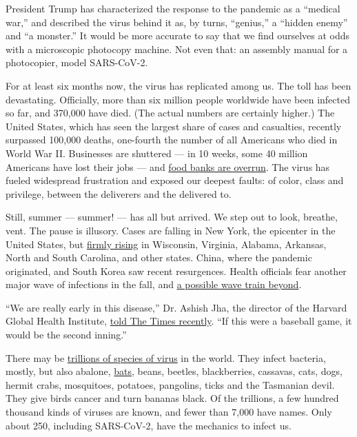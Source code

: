 President Trump has characterized the response to the pandemic as a
``medical war,'' and described the virus behind it as, by turns,
``genius,'' a ``hidden enemy'' and ``a monster.'' It would be more
accurate to say that we find ourselves at odds with a microscopic
photocopy machine. Not even that: an assembly manual for a photocopier,
model SARS-CoV-2.

For at least six months now, the virus has replicated among us. The toll
has been devastating. Officially, more than six million people worldwide
have been infected so far, and 370,000 have died. (The actual numbers
are certainly higher.) The United States, which has seen the largest
share of cases and casualties, recently surpassed 100,000 deaths,
one-fourth the number of all Americans who died in World War II.
Businesses are shuttered --- in 10 weeks, some 40 million Americans have
lost their jobs --- and
\href{https://www.nytimes.com/2020/04/08/business/economy/coronavirus-food-banks.html}{food
banks are overrun}. The virus has fueled widespread frustration and
exposed our deepest faults: of color, class and privilege, between the
deliverers and the delivered to.

Still, summer --- summer! --- has all but arrived. We step out to look,
breathe, vent. The pause is illusory. Cases are falling in New York, the
epicenter in the United States, but
\href{https://www.nytimes.com/interactive/2020/us/coronavirus-us-cases.html?action=click\&pgtype=Article\&state=default\&module=styln-coronavirus-markets\&variant=show\&region=TOP_BANNER\&context=storylines_menu\#states}{firmly
rising} in Wisconsin, Virginia, Alabama, Arkansas, North and South
Carolina, and other states. China, where the pandemic originated, and
South Korea saw recent resurgences. Health officials fear another major
wave of infections in the fall, and
\href{https://www.nytimes.com/2020/05/08/health/coronavirus-pandemic-curve-scenarios.html}{a
possible wave train beyond}.

``We are really early in this disease,'' Dr. Ashish Jha, the director of
the Harvard Global Health Institute,
\href{https://www.nytimes.com/2020/05/03/world/asia/coronavirus-spread-where-why.html?campaign_id=9\&emc=edit_nn_20200504\&instance_id=18202\&nl=the-morning\&regi_id=102543212\&segment_id=26556\&te=1\&user_id=11229ce0c34ff5caaf09af6410292613}{told
The Times recently}. ``If this were a baseball game, it would be the
second inning.''

There may be
\href{https://www.nytimes.com/2020/03/24/science/viruses-coranavirus-biology.html}{trillions
of species of virus} in the world. They infect bacteria, mostly, but
also abalone,
\href{https://www.nytimes.com/2020/01/28/science/bats-coronavirus-Wuhan.html}{bats},
beans, beetles, blackberries, cassavas, cats, dogs, hermit crabs,
mosquitoes, potatoes, pangolins, ticks and the Tasmanian devil. They
give birds cancer and turn bananas black. Of the trillions, a few
hundred thousand kinds of viruses are known, and fewer than 7,000 have
names. Only about 250, including SARS-CoV-2, have the mechanics to
infect us.

